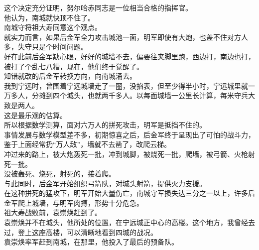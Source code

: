 \begin{multicols}{\theparacolNo}
这个决定充分证明，努尔哈赤同志是一位相当合格的指挥官。\\

他认为，南城就快顶不住了。\\

南城守将祖大寿同意这个观点。\\

就实力而言，如果后金军全力攻击城池一面，明军即使有大炮，也盖不住对方人多，失守只是个时间问题。\\

好在此前后金军缺心眼，好好的城墙不去，偏要往夹脚里跑，西边打，南边也打，被打了个乱七八糟，现在，他们终于觉醒了。\\

知错就改的后金军转换方向，向南城涌去。\\

我到宁远时，曾围着宁远城墙走了一圈，没掐表，但至少得半小时，宁远城里就一万多人，分摊到四个城头，也就两千多人。以每面城墙一公里长计算，每米守兵大致是两人。\\

这是最乐观的估算。\\

所以根据数学测算，面对六万人的拼死攻击，明军是抵挡不住的。\\

事情发展与数学模型差不多，初期惊喜之后，后金军终于呈现出了可怕的战斗力，鉴于上面经常扔“万人敌”，墙就不去凿了，改爬云梯。\\

冲过来的路上，被大炮轰死一批，冲到城脚，被烧死一批，爬墙，被弓箭、火枪射死一批。\\

没被轰死、烧死，射死的，接着爬。\\

与此同时，后金军开始组织弓箭队，对城头射箭，提供火力支援。\\

在这种拼死的猛攻下，明军开始大量伤亡，南城守军损失达三分之一以上，许多后金军爬上城墙，与明军肉搏，形势十分危急。\\

祖大寿战败前，袁崇焕赶到了。\\

袁崇焕并不在城头，他所处的位置，在宁远城正中心的高楼。这个地方，我曾经去过，登上这座高楼，可以清晰地看到四城的战况。\\

袁崇焕率军赶到南城，在那里，他投入了最后的预备队。\\


\end{multicols}
